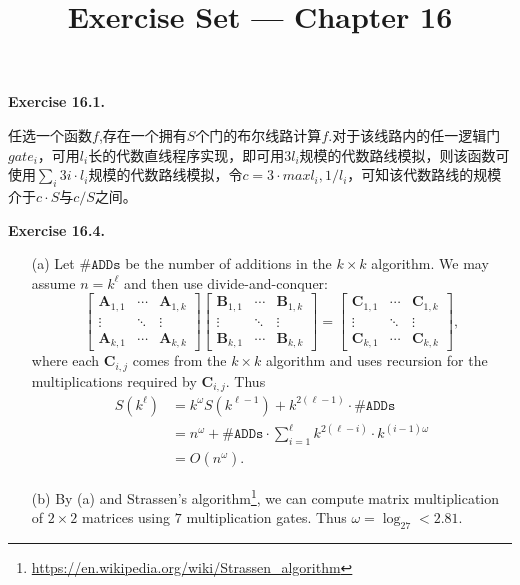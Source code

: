 \documentclass[a4paper]{article}
\title{Exercise Set --- Chapter 16}
\date{}
\newenvironment{exercise}[1]{
	\par
	\noindent\textbf{Exercise #1.}\quad
}{
	\par
	\bigskip
}
\begin{document}
    \maketitle

    \begin{exercise}{16.1}
		任选一个函数$f$,存在一个拥有$S$个门的布尔线路计算$f$.对于该线路内的任一逻辑门$gate_i$，可用$l_i$长的代数直线程序实现，即可用$3l_i$规模的代数路线模拟，则该函数可使用$\sum_i 3i\cdot l_i$规模的代数路线模拟，令$c=3\cdot max{l_i,1/l_i}$，可知该代数路线的规模介于$c\cdot S$与$c/S$之间。
	\end{exercise}

    \begin{exercise}{16.4}
        \begin{itemize}
            \item[(a)]
                Let $\#\texttt{ADDs}$ be the number of additions in the $k\times k$ algorithm.
                We may assume $n=k^\ell$ and then use divide-and-conquer:
                $$
                \begin{bmatrix}
                    \bm A_{1,1} & \cdots & \bm A_{1,k} \\
                    \vdots & \ddots & \vdots \\
                    \bm A_{k,1} & \cdots & \bm A_{k,k}
                \end{bmatrix}
                \begin{bmatrix}
                    \bm B_{1,1} & \cdots & \bm B_{1,k} \\
                    \vdots & \ddots & \vdots \\
                    \bm B_{k,1} & \cdots & \bm B_{k,k}
                \end{bmatrix}
                =
                \begin{bmatrix}
                    \bm C_{1,1} & \cdots & \bm C_{1,k} \\
                    \vdots & \ddots & \vdots \\
                    \bm C_{k,1} & \cdots & \bm C_{k,k}
                \end{bmatrix},
                $$
                where each $\bm C_{i,j}$ comes from the $k\times k$ algorithm and 
                uses recursion for the multiplications required by $\bm C_{i,j}$.
                Thus 
                \begin{align*}
                    S(k^\ell)
                    &=k^\omega S(k^{\ell-1})+k^{2(\ell-1)}\cdot\#\texttt{ADDs}\\
                    &=n^{\omega}+\#\texttt{ADDs}\cdot\sum_{i=1}^\ell k^{2(\ell-i)}\cdot k^{(i-1)\omega}\\
                    &=O(n^\omega).
                \end{align*}
            \item[(b)]
                By (a) and Strassen's algorithm\footnote{\url{https://en.wikipedia.org/wiki/Strassen_algorithm}}, we can compute
                matrix multiplication of $2\times2$ matrices using $7$ multiplication gates. Thus $\omega=\log_27<2.81$.
        \end{itemize}
    \end{exercise}
\end{document}
